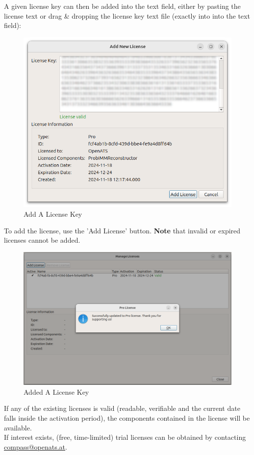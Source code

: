 A given license key can then be added into the text field, either by pasting the license text or drag \& dropping the license key text file (exactly into into the text field):

\begin{figure}[H]
    \includegraphics[width=14cm]{figures/configure_license_add2.png}
  \caption{Add A License Key}
\end{figure}

To add the license, use the 'Add License' button. 
\textbf{Note} that invalid or expired licenses cannot be added.

\begin{figure}[H]
    \includegraphics[width=14cm]{figures/configure_license_add3.png}
  \caption{Added A License Key}
\end{figure}

If any of the existing licenses is valid (readable, verifiable and the current date falls inside the activation period), the components contained in the license will be available. \\

If interest exists, (free, time-limited) trial licenses can be obtained by contacting \href{mailto:compass@openats.at}{compass@openats.at}.
